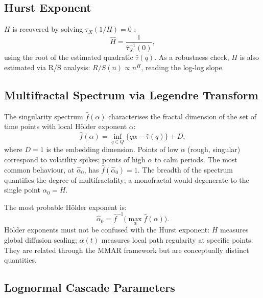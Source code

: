 \documentclass[12pt,a4paper]{article}
\begin{document}
\subsection{Hurst Exponent}

$H$ is recovered by solving $\tau_X(1/H) = 0$ \citep{mandelbrot1997}:
\begin{equation}
  \hat{H} = \frac{1}{\hat{\tau}_X^{-1}(0)},
  \label{eq:hurst-from-tau}
\end{equation}
using the root of the estimated quadratic $\hat{\tau}(q)$. As a
robustness check, $H$ is also estimated via R/S analysis:
$R/S(n) \propto n^H$, reading the log-log slope.

\subsection{Multifractal Spectrum via Legendre Transform}

The singularity spectrum $\hat{f}(\alpha)$ characterises the fractal
dimension of the set of time points with local H\"{o}lder exponent
$\alpha$:
\begin{equation}
  \hat{f}(\alpha) = \inf_{q \in Q}\bigl\{q\alpha - \hat{\tau}(q)\bigr\} + D,
  \label{eq:legendre}
\end{equation}
where $D = 1$ is the embedding dimension. Points of low $\alpha$
(rough, singular) correspond to volatility spikes; points of high
$\alpha$ to calm periods. The most common behaviour, at
$\hat{\alpha}_0$, has $\hat{f}(\hat{\alpha}_0) = 1$. The breadth of
the spectrum quantifies the degree of multifractality; a monofractal
would degenerate to the single point $\alpha_0 = H$.

The most probable H\"{o}lder exponent is:
\begin{equation}
  \hat{\alpha}_0 = \hat{f}^{-1}\!\bigl(\max_\alpha \hat{f}(\alpha)\bigr).
  \label{eq:alpha0}
\end{equation}
H\"{o}lder exponents must not be confused with the Hurst exponent:
$H$ measures global diffusion scaling; $\alpha(t)$ measures local path
regularity at specific points. They are related through the MMAR
framework but are conceptually distinct quantities.

\subsection{Lognormal Cascade Parameters}
\end{document}
